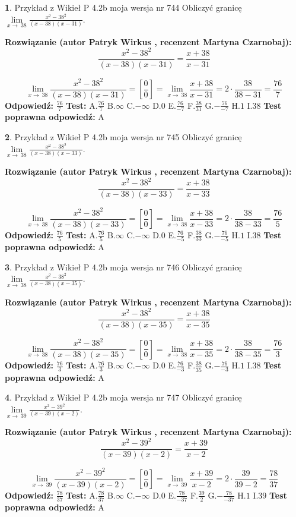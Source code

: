\documentclass[12pt, a4paper]{article}
\theoremstyle{definition} %
\newtheorem{zad}{}
\newcommand{\zadStart}[1]{\begin{zad}#1\newline}
\newcommand{\zadStop}{\end{zad}}
\newcommand{\rozwStart}[2]{\noindent \textbf{Rozwiązanie (autor #1 , recenzent #2): }\newline}
\newcommand{\rozwStop}{\newline}
\newcommand{\odpStart}{\noindent \textbf{Odpowiedź:}\newline}
\newcommand{\odpStop}{\newline}
\newcommand{\testStart}{\noindent \textbf{Test:}\newline}
\newcommand{\testStop}{\newline}
\newcommand{\kluczStart}{\noindent \textbf{Test poprawna odpowiedź:}\newline}
\newcommand{\kluczStop}{\newline}
\begin{document}
\zadStart{Przykład z Wikieł P 4.2b moja wersja nr 744}
Obliczyć granicę $\lim\limits_{x\to\ 38}\frac{x^{2}-38^{2}}{(x-38)(x-31)}$.
\zadStop
\rozwStart{Patryk Wirkus}{Martyna Czarnobaj}
$$\frac{x^{2}-38^{2}}{(x-38)(x-31)}=\frac{x+38}{x-31}$$

$$\lim\limits_{x\to\ 38}\frac{x^{2}-38^{2}}{(x-38)(x-31)}=[\frac{0}{0}]=\lim\limits_{x\to\ 38}\frac{x+38}{x-31}=2 \cdot \frac{38}{38-31} = \frac{76}{7}$$
\rozwStop
\odpStart
$\frac{76}{7}$
\odpStop
\testStart
A.$\frac{76}{7}$
B.$\infty$
C.$-\infty$
D.$0$
E.$\frac{76}{-7}$
F.$\frac{38}{31}$
G.$-\frac{76}{-7}$
H.$1$
I.$38$
\testStop
\kluczStart
A
\kluczStop



\zadStart{Przykład z Wikieł P 4.2b moja wersja nr 745}
Obliczyć granicę $\lim\limits_{x\to\ 38}\frac{x^{2}-38^{2}}{(x-38)(x-33)}$.
\zadStop
\rozwStart{Patryk Wirkus}{Martyna Czarnobaj}
$$\frac{x^{2}-38^{2}}{(x-38)(x-33)}=\frac{x+38}{x-33}$$

$$\lim\limits_{x\to\ 38}\frac{x^{2}-38^{2}}{(x-38)(x-33)}=[\frac{0}{0}]=\lim\limits_{x\to\ 38}\frac{x+38}{x-33}=2 \cdot \frac{38}{38-33} = \frac{76}{5}$$
\rozwStop
\odpStart
$\frac{76}{5}$
\odpStop
\testStart
A.$\frac{76}{5}$
B.$\infty$
C.$-\infty$
D.$0$
E.$\frac{76}{-5}$
F.$\frac{38}{33}$
G.$-\frac{76}{-5}$
H.$1$
I.$38$
\testStop
\kluczStart
A
\kluczStop



\zadStart{Przykład z Wikieł P 4.2b moja wersja nr 746}
Obliczyć granicę $\lim\limits_{x\to\ 38}\frac{x^{2}-38^{2}}{(x-38)(x-35)}$.
\zadStop
\rozwStart{Patryk Wirkus}{Martyna Czarnobaj}
$$\frac{x^{2}-38^{2}}{(x-38)(x-35)}=\frac{x+38}{x-35}$$

$$\lim\limits_{x\to\ 38}\frac{x^{2}-38^{2}}{(x-38)(x-35)}=[\frac{0}{0}]=\lim\limits_{x\to\ 38}\frac{x+38}{x-35}=2 \cdot \frac{38}{38-35} = \frac{76}{3}$$
\rozwStop
\odpStart
$\frac{76}{3}$
\odpStop
\testStart
A.$\frac{76}{3}$
B.$\infty$
C.$-\infty$
D.$0$
E.$\frac{76}{-3}$
F.$\frac{38}{35}$
G.$-\frac{76}{-3}$
H.$1$
I.$38$
\testStop
\kluczStart
A
\kluczStop



\zadStart{Przykład z Wikieł P 4.2b moja wersja nr 747}
Obliczyć granicę $\lim\limits_{x\to\ 39}\frac{x^{2}-39^{2}}{(x-39)(x-2)}$.
\zadStop
\rozwStart{Patryk Wirkus}{Martyna Czarnobaj}
$$\frac{x^{2}-39^{2}}{(x-39)(x-2)}=\frac{x+39}{x-2}$$

$$\lim\limits_{x\to\ 39}\frac{x^{2}-39^{2}}{(x-39)(x-2)}=[\frac{0}{0}]=\lim\limits_{x\to\ 39}\frac{x+39}{x-2}=2 \cdot \frac{39}{39-2} = \frac{78}{37}$$
\rozwStop
\odpStart
$\frac{78}{37}$
\odpStop
\testStart
A.$\frac{78}{37}$
B.$\infty$
C.$-\infty$
D.$0$
E.$\frac{78}{-37}$
F.$\frac{39}{2}$
G.$-\frac{78}{-37}$
H.$1$
I.$39$
\testStop
\kluczStart
A
\kluczStop
\end{document}
